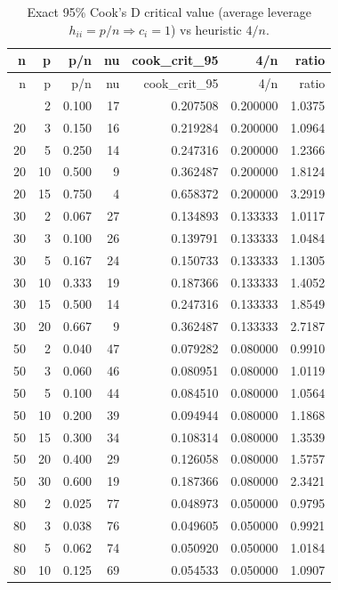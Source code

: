 \documentclass[
  letterpaper,
  DIV=11,
  numbers=noendperiod]{scrreprt}
\begin{document}
\begin{longtable}[]{@{}rrrrrrr@{}}
\caption{Exact 95\% Cook's D critical value (average leverage
\(h_{ii}=p/n \Rightarrow c_i=1\)) vs heuristic \(4/n\).}\tabularnewline
\toprule\noalign{}
n & p & p/n & nu & cook\_crit\_95 & 4/n & ratio \\
\midrule\noalign{}
\endfirsthead
\toprule\noalign{}
n & p & p/n & nu & cook\_crit\_95 & 4/n & ratio \\
\midrule\noalign{}
\endhead
\bottomrule\noalign{}
\endlastfoot
20 & 2 & 0.100 & 17 & 0.207508 & 0.200000 & 1.0375 \\
20 & 3 & 0.150 & 16 & 0.219284 & 0.200000 & 1.0964 \\
20 & 5 & 0.250 & 14 & 0.247316 & 0.200000 & 1.2366 \\
20 & 10 & 0.500 & 9 & 0.362487 & 0.200000 & 1.8124 \\
20 & 15 & 0.750 & 4 & 0.658372 & 0.200000 & 3.2919 \\
30 & 2 & 0.067 & 27 & 0.134893 & 0.133333 & 1.0117 \\
30 & 3 & 0.100 & 26 & 0.139791 & 0.133333 & 1.0484 \\
30 & 5 & 0.167 & 24 & 0.150733 & 0.133333 & 1.1305 \\
30 & 10 & 0.333 & 19 & 0.187366 & 0.133333 & 1.4052 \\
30 & 15 & 0.500 & 14 & 0.247316 & 0.133333 & 1.8549 \\
30 & 20 & 0.667 & 9 & 0.362487 & 0.133333 & 2.7187 \\
50 & 2 & 0.040 & 47 & 0.079282 & 0.080000 & 0.9910 \\
50 & 3 & 0.060 & 46 & 0.080951 & 0.080000 & 1.0119 \\
50 & 5 & 0.100 & 44 & 0.084510 & 0.080000 & 1.0564 \\
50 & 10 & 0.200 & 39 & 0.094944 & 0.080000 & 1.1868 \\
50 & 15 & 0.300 & 34 & 0.108314 & 0.080000 & 1.3539 \\
50 & 20 & 0.400 & 29 & 0.126058 & 0.080000 & 1.5757 \\
50 & 30 & 0.600 & 19 & 0.187366 & 0.080000 & 2.3421 \\
80 & 2 & 0.025 & 77 & 0.048973 & 0.050000 & 0.9795 \\
80 & 3 & 0.038 & 76 & 0.049605 & 0.050000 & 0.9921 \\
80 & 5 & 0.062 & 74 & 0.050920 & 0.050000 & 1.0184 \\
80 & 10 & 0.125 & 69 & 0.054533 & 0.050000 & 1.0907 \\

\end{longtable}
\end{document}
